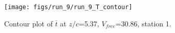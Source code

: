 \begin{figure}[H]
\centering
\texttt{[image: figs/run\_9/run\_9\_T\_contour]}
\caption{Contour plot of $\overline{t}$ at $z/c$=5.37, $V_{free}$=30.86, station 1.}
\label{fig:run_9_T_contour}
\end{figure}


